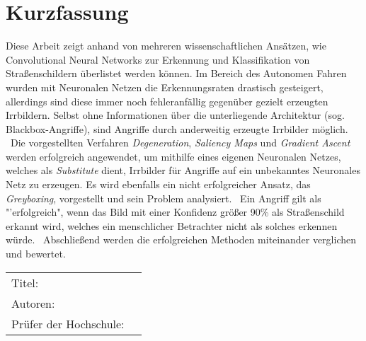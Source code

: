 \chapter*{Kurzfassung} 
Diese Arbeit zeigt anhand von mehreren wissenschaftlichen Ansätzen, wie Convolutional Neural Networks zur Erkennung und Klassifikation von Straßenschildern überlistet werden können.
Im Bereich des Autonomen Fahren wurden mit Neuronalen Netzen die Erkennungsraten drastisch gesteigert, allerdings sind diese immer noch fehleranfällig gegenüber gezielt erzeugten Irrbildern. Selbst ohne Informationen über die unterliegende Architektur (sog. Blackbox-Angriffe), sind Angriffe durch anderweitig erzeugte Irrbilder möglich.
~\newline Die vorgestellten Verfahren \textit{Degeneration}, \textit{Saliency Maps} und \textit{Gradient Ascent} werden erfolgreich angewendet, um mithilfe eines eigenen Neuronalen Netzes, welches als \textit{Substitute} dient, Irrbilder für Angriffe auf ein unbekanntes Neuronales Netz zu erzeugen. Es wird ebenfalls ein nicht erfolgreicher Ansatz, das \textit{Greyboxing}, vorgestellt und sein Problem analysiert.
~\newline Ein Angriff gilt als "'erfolgreich", wenn das Bild mit einer Konfidenz größer 90\% als Straßenschild erkannt wird, welches ein menschlicher Betrachter nicht als solches erkennen würde.
~\newline Abschließend werden die erfolgreichen Methoden miteinander verglichen und bewertet. 
~\newline 
~\newline
\begin{flushleft}
	\begin{tabular}{lp{11cm}}
		Titel:&  \titel \\ 
		Autoren:&  \autor \\
		Prüfer der Hochschule: &  \betreuerth \\ 
		[6ex]%
	\end{tabular} 
\end{flushleft}
